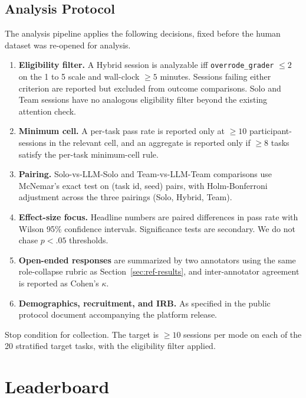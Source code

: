 \documentclass{article}
\begin{document}
\subsection{Analysis Protocol}
\label{app:human-prereg}

The analysis pipeline applies the following decisions, fixed before the human dataset was re-opened for analysis.

\begin{enumerate}[leftmargin=*]
\item \textbf{Eligibility filter.} A Hybrid session is analyzable iff \texttt{overrode\_grader} $\leq 2$ on the 1 to 5 scale and wall-clock $\geq 5$ minutes. Sessions failing either criterion are reported but excluded from outcome comparisons. Solo and Team sessions have no analogous eligibility filter beyond the existing attention check.
\item \textbf{Minimum cell.} A per-task pass rate is reported only at $\geq 10$ participant-sessions in the relevant cell, and an aggregate is reported only if $\geq 8$ tasks satisfy the per-task minimum-cell rule.
\item \textbf{Pairing.} Solo-vs-LLM-Solo and Team-vs-LLM-Team comparisons use McNemar's exact test on (task id, seed) pairs, with Holm-Bonferroni adjustment across the three pairings (Solo, Hybrid, Team).
\item \textbf{Effect-size focus.} Headline numbers are paired differences in pass rate with Wilson 95\% confidence intervals. Significance tests are secondary. We do not chase $p < .05$ thresholds.
\item \textbf{Open-ended responses} are summarized by two annotators using the same role-collapse rubric as Section~\ref{sec:ref-results}, and inter-annotator agreement is reported as Cohen's $\kappa$.
\item \textbf{Demographics, recruitment, and IRB.} As specified in the public protocol document accompanying the platform release.
\end{enumerate}

Stop condition for collection. The target is $\geq 10$ sessions per mode on each of the 20 stratified target tasks, with the eligibility filter applied.



\section{Leaderboard}
\label{app:leaderboard-eval}
\end{document}
